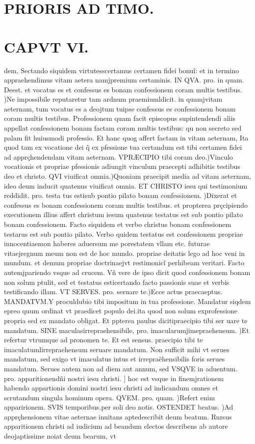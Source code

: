 \documentclass{article}
\begin{document}
\begin{pages}
\section*{PRIORIS AD TIMO. }
\section*{CAPVT VI. }\pstart dem, Sectando siquidem virtutesscertamus certamen fidei bonuĩ: et in termino appraehendimus vitam aetera namjpremium certaminis. IN QVA. pro. in quam. Deest. et vocatus es et confessus es bonam confessionem coram multis testibus. )Ne impossibile reputaretur tam ardnum praemiumldicit. in quamjvitam aeternam, tum vocatus es a deojtum tuipse confessus es confessionem bonam coram multis testibus. Professionem quam facit episcopus supintendendi aliis appellat confessionem bonam factam coram multis testibus: qu non secreto sed palam fit huiusmodi professio. Et hanc quog affert factam in vitam aeternam, Ita quod tam ex vocatione dei q̃ ex pfessione tua certandum est tibi certamen fidei ad apprçhendendam vitam aeternam. VPRÆCIPIO tibi coram deo.)Vinculo vocationis et propriae pfessionis adiungit vinculum praecepti adhibitis testibus deo et christo. QVI viuificat omnia.)Quoniam praecipit media ad vitam aeternam, ideo deum inducit quatenus viuificat omnia. ET CHRISTO iesu qui testimonium reddidit. pro. testa tus estisub pontio pilato bonam confessionem. )Dixerat et confessus es bonam confessionem coram multis testibus. et propterea prçcipiendo executionem illius affert christum iesum quatenus testatus est sub pontio pilato bonam confessionem. Facto siquidem et verbo christus bonam confessionem testarus est sub pontio pilato. Verbo quidem testatus est confessionem propriae innocentiaemon haberes aduersum me porestatem vllam etc. futurae vitaejregnum meum non est de hoc mundo. propriae deitatis lego ad hoc veni in mundum. et demum propriae doctrinaejvt restimonicĩ perhibeam veritari. Facto autemjpariendo vsque ad crucem. Vñ vere de ipso dicit quod confessionem bonam non solum ptulit, sed et testatus esticertando facto passionis suae et verbis testificando illam. VT SERVES. pro. seruare te.)Ecce actus praecaeptus. MANDATVM.Y proculdubio tibi impositum in tua professione. Mandatur siqdem epreo quum ordinat vt praedicet populo dei.ita quod non solum exprofessione propria sed ex mandato obligat. Et ppterea paulus dicitipraecipio tibi ser uare te mandatum. SINE maculasirrepraehensibile, pro. imacularumjimepraehensum. )Et refertur vtrumque ad pronomen te. Et est sensus. praecipio tibi te imaculatumlirrepraehensum seruare mandatum. Non sufficit mihi vt serues mandatum, sed exigo vt imaculatus intus et irrepraẽhensibilis foris serues mandatum. Serues autem non ad diem aut annum, sed VSQVE in aduentum. pro. apparitionendñi nostri iesu christi. ] hoc est vsque  in finemjrationem habendo appartionis domini nostri iesu christi ad indicandum omnes et scrutandum singula hominum opera. QVEM. pro. quam. )Refert enim apparirionem. SVIS temporibus.per soli deo notis. OSTENDET beatus. )Ad apprçhensionem vitae aeternae inuitans aptedescribit deum beatum. Rursus apparitionem christi ad iudicium ad beandum electos describens ab autore deojaptissime noiat deum bearum, vt 
\end{pages}
\end{document}
